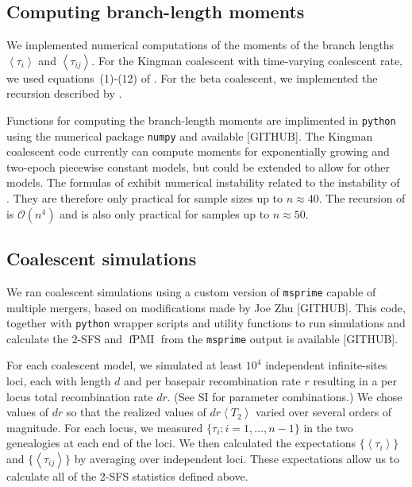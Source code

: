 \documentclass[11pt, letterpaper]{article}   	%
\newcommand{\E}[1]{\left< #1 \right>}
\DeclareMathOperator{\fpmi}{fPMI}
\begin{document}
\subsection*{Computing branch-length moments}

We implemented numerical computations of the moments of the branch lengths $\E{\tau_i}$ and $\E{\tau_{ij}}$.
For the Kingman coalescent with time-varying coalescent rate, we used equations~(1)-(12) of \cite{ZivkovicWiehe2008}.
For the beta coalescent, we implemented the recursion described by \cite{BirknerEtAl2013}.

Functions for computing the branch-length moments are implimented in \texttt{python} using the numerical package \texttt{numpy} \autocite{numpy} and available [GITHUB].
The Kingman coalescent code currently can compute moments for exponentially growing and two-epoch piecewise constant models, but could be extended to allow for other models.
The formulas of \cite{ZivkovicWiehe2008} exhibit numerical instability related to the instability of \cite{GriffithsTavare1994}.
They are therefore only practical for sample sizes up to $n \approx 40$.
The recursion of \cite{BirknerEtAl2013} is $\mathcal{O}(n^4)$ and is also only practical for samples up to $n \approx 50$.

\subsection*{Coalescent simulations}

We ran coalescent simulations using a custom version of \texttt{msprime} \autocite{KelleherEtAl2014} capable of multiple mergers, based on modifications made by Joe Zhu [GITHUB].
This code, together with \texttt{python} wrapper scripts and utility functions to run simulations and calculate the 2-SFS and $\fpmi$ from the \texttt{msprime} output is available [GITHUB].

For each coalescent model, we simulated at least $10^4$ independent infinite-sites loci, each with length $d$ and per basepair recombination rate $r$ resulting in a per locus total recombination rate $d r$.
(See SI for parameter combinations.)
We chose values of $d r$ so that the realized values of $d r \E{T_2}$ varied over several orders of magnitude.
For each locus, we measured $\{\tau_i : i = 1,\ldots,n-1\}$ in the two genealogies at each end of the loci.
We then calculated the expectations $\{\E{\tau_i}\}$ and $\{\E{\tau_{ij}}\}$ by averaging over independent loci.
These expectations allow us to calculate all of the 2-SFS statistics defined above.
\end{document}

